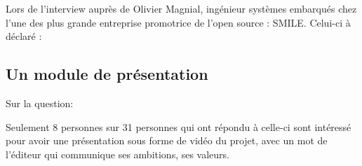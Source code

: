 			\newpage

			Lors de l'interview auprès de Olivier Magnial, ingénieur systèmes embarqués chez l'une des plus grande entreprise promotrice de l'open source : SMILE. Celui-ci à déclaré : 

			\begin{center}
				\textit{
				}
			\end{center}

		\subsection{Un module de présentation}

			Sur la question:

			\begin{center}
				\textit{
				}
			\end{center}

			Seulement 8 personnes sur 31 personnes qui ont répondu à celle-ci sont intéressé pour avoir une présentation sous forme de vidéo du projet, avec un mot de l'éditeur qui communique ses ambitions, ses valeurs.

